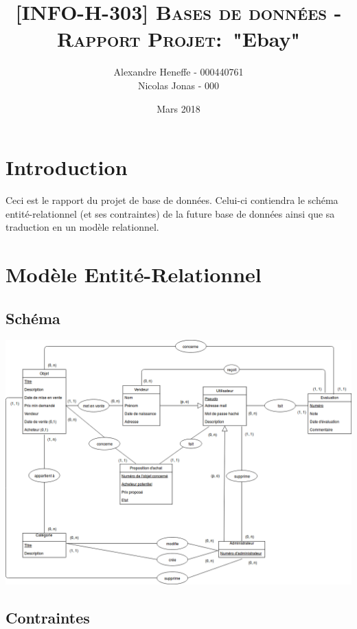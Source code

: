 \documentclass{article}
\title{\textsc{[INFO-H-303] Bases de données - Rapport Projet:}\
   "Ebay"}
\author{Alexandre Heneffe - 000440761\\
        Nicolas Jonas - 000}
\date{Mars 2018}
\begin{document}
\maketitle
\section{Introduction}

Ceci est le rapport du projet de base de données. Celui-ci contiendra le schéma entité-relationnel (et ses contraintes) de la future base de données ainsi que sa traduction en un modèle relationnel.

\section{Modèle Entité-Relationnel}

\subsection{Schéma}

\begin{center}
    \includegraphics[scale=0.45,left]{schemaEA}
\end{center}

\newpage

\subsection{Contraintes}
\end{document}

